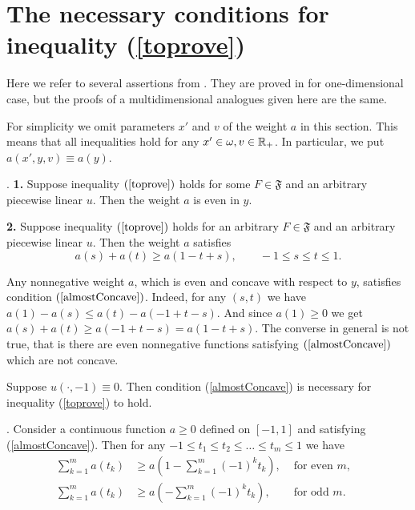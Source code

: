 \section{The necessary conditions for inequality (\ref{toprove})}

Here we refer to several assertions from \cite{1dim}.
They are proved in \cite{1dim} for one-dimensional case, but the proofs of a multidimensional analogues given here are the same.

For simplicity we omit parameters $x'$ and $v$ of the weight $a$ in this section.
This means that all inequalities hold for any $x' \in \omega, v \in \mathbb R_+$.
In particular, we put $a( x', y, v ) \equiv a( y )$.

\begin{prop}
{\rm \cite[Theorem 1]{1dim}.}
{\bf 1.} Suppose inequality $(\ref{toprove})$ holds for some $F \in \mathfrak{F}$
and an arbitrary piecewise linear $u$.
Then the weight $a$ is even in $y$.

{\bf 2.} Suppose inequality $(\ref{toprove})$ holds for an arbitrary $F \in \mathfrak{F}$
and an arbitrary piecewise linear $u$.
Then the weight $a$ satisfies
\begin{equation}
\label{almostConcave}
a( s ) + a( t ) \ge a( 1 - t + s ), \qquad -1 \le s \le t \le 1.
\end{equation}
\end{prop}

\begin{rem}
Any nonnegative weight $a$, which is even and concave with respect to $y$, satisfies condition $(\ref{almostConcave})$.
Indeed, for any $(s, t)$ we have $a( 1 ) - a( s ) \le a( t ) - a( -1 + t - s )$.
And since $a( 1 ) \ge 0$ we get $a( s ) + a( t ) \ge a( -1 + t - s ) = a( 1 - t + s )$.
The converse in general is not true, that is there are even nonnegative functions satisfying $(\ref{almostConcave})$ which are not concave.
\end{rem}

\begin{rem}
\label{lanNec}
Suppose $u(\cdot, -1) \equiv 0$.
Then condition (\ref{almostConcave}) is necessary for inequality (\ref{toprove}) to hold.
\end{rem}

\begin{prop}
\label{weightSum}
{\rm \cite[Lemma 1]{1dim}.}
Consider a continuous function $a \ge 0$ defined on $[-1,1]$
and satisfying (\ref{almostConcave}).
Then for any $-1 \le t_1 \le t_2 \le \ldots \le t_m \le 1$ we have
\begin{align*}
\sum_{k=1}^m a(t_k) & \ge a( 1 - \sum_{k = 1}^m (-1)^k t_k ), & \text{ for even $m$},&\\
\sum_{k=1}^m a(t_k) & \ge a( -\sum_{k = 1}^m (-1)^k t_k ),    & \text{ for odd $m$}.&
\end{align*}
\end{prop}
